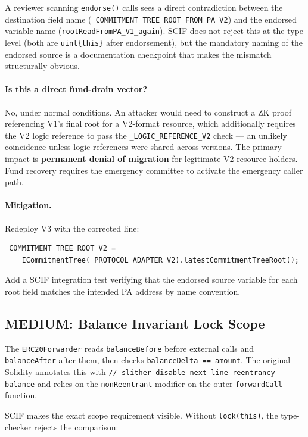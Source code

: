 \documentclass[11pt,a4paper]{article}
\begin{document}
A reviewer scanning \texttt{endorse()} calls sees a direct contradiction between
the destination field name (\texttt{\_COMMITMENT\_TREE\_ROOT\_FROM\_PA\_V2}) and
the endorsed variable name (\texttt{rootReadFromPA\_V1\_again}). SCIF does not
reject this at the type level (both are \texttt{uint\{this\}} after
endorsement), but the mandatory naming of the endorsed source is a documentation
checkpoint that makes the mismatch structurally obvious.

\paragraph{Is this a direct fund-drain vector?}
No, under normal conditions. An attacker would need to construct a ZK proof
referencing V1's final root for a V2-format resource, which additionally
requires the V2 logic reference to pass the \texttt{\_LOGIC\_REFERENCE\_V2}
check --- an unlikely coincidence unless logic references were shared across
versions. The primary impact is \textbf{permanent denial of migration} for
legitimate V2 resource holders. Fund recovery requires the emergency committee
to activate the emergency caller path.

\paragraph{Mitigation.} Redeploy V3 with the corrected line:
\begin{lstlisting}[style=soliditystyle]
_COMMITMENT_TREE_ROOT_V2 =
    ICommitmentTree(_PROTOCOL_ADAPTER_V2).latestCommitmentTreeRoot();
\end{lstlisting}
Add a SCIF integration test verifying that the endorsed source variable for each
root field matches the intended PA address by name convention.

\subsection{MEDIUM: Balance Invariant Lock Scope}
\label{sec:med-balance}

The \texttt{ERC20Forwarder} reads \texttt{balanceBefore} before external calls
and \texttt{balanceAfter} after them, then checks
\texttt{balanceDelta == amount}. The original Solidity annotates this with
\texttt{// slither-disable-next-line reentrancy-balance} and relies on the
\texttt{nonReentrant} modifier on the outer \texttt{forwardCall} function.

SCIF makes the exact scope requirement visible. Without \texttt{lock(this)},
the type-checker rejects the comparison:
\end{document}

